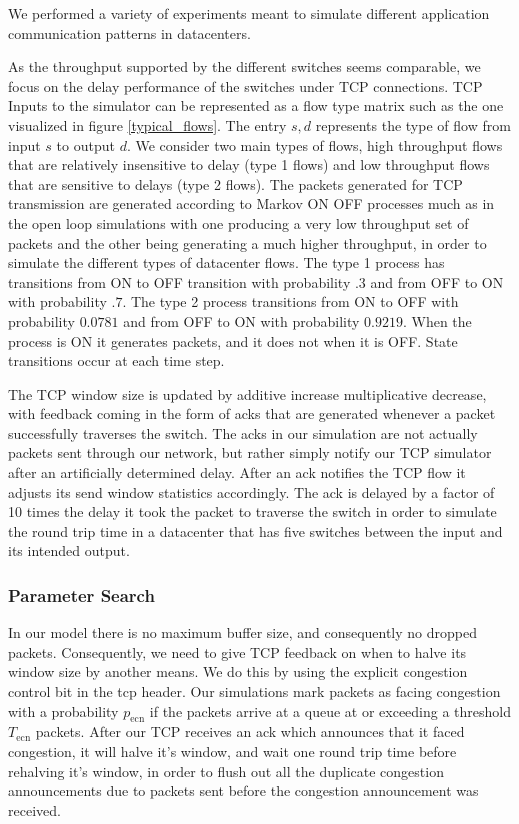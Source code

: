 \documentclass[11pt]{article}%
\begin{document}
We performed a variety of experiments meant to simulate different application communication patterns in datacenters.

As the throughput supported by the different switches seems comparable, we focus on the delay performance of the switches under TCP connections.  TCP Inputs to the simulator can be represented as a flow type matrix such as the one visualized in figure \ref{typical_flows}.  The entry $s,d$ represents the type of flow from input $s$ to output $d$.  We consider two main types of flows, high throughput flows that are relatively insensitive to delay (type 1 flows) and low throughput flows that are sensitive to delays (type 2 flows).  The packets generated for TCP transmission are generated according to Markov ON OFF processes much as in the open loop simulations with one producing a very low throughput set of packets and the other being generating a much higher throughput, in order to simulate the different types of datacenter flows.  The type 1 process has transitions from ON to OFF transition with probability $.3$ and from OFF to ON with probability $.7$.  The type 2 process transitions from ON to OFF with probability $0.0781$ and from OFF to ON with probability $0.9219$.  When the process is ON it generates packets, and it does not when it is OFF.   State transitions occur at each time step.

The TCP window size is updated by additive increase multiplicative decrease, with feedback coming in the form of acks that are generated whenever a packet successfully traverses the switch.  The acks in our simulation are not actually packets sent through our network, but rather simply notify our TCP simulator after an artificially determined delay.  After an ack notifies the TCP flow it adjusts its send window statistics accordingly.  The ack is delayed by a factor of 10 times the delay it took the packet to traverse the switch in order to simulate the round trip time in a datacenter that has five switches between the input and its intended output.

\subsubsection{Parameter Search}

In our model there is no maximum buffer size, and consequently no dropped packets.  Consequently, we need to give TCP feedback on when to halve its window size by another means.  We do this by using the explicit congestion control bit in the tcp header.  Our simulations mark packets as facing congestion with a probability $p_{\text{ecn}}$ if the packets arrive at a queue at or exceeding a threshold $T_{\text{ecn}}$ packets.  After our TCP receives an ack which announces that it faced congestion, it will halve it's window, and wait one round trip time before rehalving it's window, in order to flush out all the duplicate congestion announcements due to packets sent before the congestion announcement was received.
\end{document}
